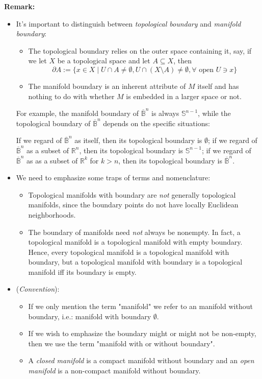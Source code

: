 \noindent\textbf{Remark:} \begin{itemize}
    \item It's important to distinguish between \textit{topological boundary} and \textit{manifold boundary}:
    \begin{itemize}
        \item The topological boundary relies on the outer space containing it, say, if we let $X$ be a topological space and let $A\subseteq X$, then
        \[
        \partial A:= \{ x\in X\mid U\cap A\neq \emptyset, U\cap (X\setminus A)\neq \emptyset, \forall \text{ open }U\ni x\}
        \]
        \item The manifold boundary is an inherent attribute of $M$ itself and has nothing to do with whether $M$ is embedded in a larger space or not.
    \end{itemize}
    For example, the manifold boundary of $\overline{\mathbb{B}}^n$ is always $\mathbb{S}^{n-1}$, while the topological boundary of $\overline{\mathbb{B}}^n$ depends on the specific situations:

    If we regard of $\overline{\mathbb{B}}^n$ as itself, then its topological boundary is $\emptyset$; if we regard of $\overline{\mathbb{B}}^n$ as a subset of $\mathbb{R}^n$, then its topological boundary is $\mathbb{S}^{n-1}$; if we regard of $\overline{\mathbb{B}}^n$ as as a subset of $\mathbb{R}^k$ for $k>n$, then its topological boundary is $\overline{\mathbb{B}}^n$.

    \item We need to emphasize some traps of terms and nomenclature:
    \begin{itemize}
        \item Topological manifolds with boundary are \textit{not} generally topological manifolds, since the boundary points do not have locally Euclidean neighborhoods.
        \item The boundary of manifolds need \textit{not} always be nonempty. In fact, a topological manifold is a topological manifold with empty boundary. Hence, every topological manifold is a topological manifold with boundary, but a topological manifold with boundary is a topological manifold iff its boundary is empty.
    \end{itemize}

    \item (\textit{Convention}): \begin{itemize}
        \item If we only mention the term "manifold" we refer to an manifold without boundary, i.e.: manifold with boundary $\emptyset$.
        \item If we wish to emphasize the boundary might or might not be non-empty, then we use the term "manifold with or without boundary".
        \item A \textit{closed manifold} is a compact manifold without boundary and an \textit{open manifold} is a non-compact manifold without boundary.
    \end{itemize}
\end{itemize}

